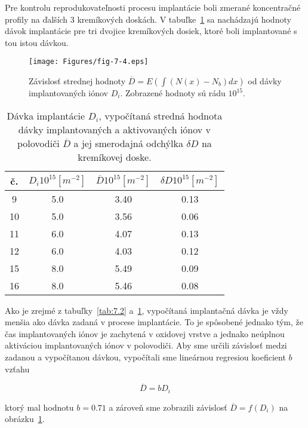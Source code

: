 Pre kontrolu reprodukovateľnosti procesu implantácie boli zmerané
koncentračné profily na ďalších 3 kremíkových doskách.  V
tabuľke~\ref{tab:7.3} sa nachádzajú hodnoty dávok implantácie pre tri
dvojice kremíkových dosiek, ktoré boli implantované s tou istou
dávkou.

\newpage
\begin{figure}[h!]\centering
  \texttt{[image: Figures/fig-7-4.eps]}
  \caption[Závislosť strednej hodnoty
    $\overline{D}=E(\int(N(x)-N_{b})dx)$ od dávky implantovaných iónov
    $D_{i}$]{Závislosť strednej hodnoty
    $\overline{D}=E(\int(N(x)-N_{b})dx)$ od dávky implantovaných iónov
    $D_{i}$. Zobrazené hodnoty sú rádu $10^{15}$.}\label{fig:7.4}
\end{figure}

\begin{table}[h!]\centering
  \begin{tabular}{c c c c}
    \hline
    č. & $D_{i} 10^{15} [m^{-2}]$ & $\overline D 10^{15} [m^{-2}]$ & $\delta D 10^{15} [m^{-2}]$\\
    \hline
     9 & 5.0 & 3.40 & 0.13\\
    10 & 5.0 & 3.56 & 0.06\\
    11 & 6.0 & 4.07 & 0.13\\
    12 & 6.0 & 4.03 & 0.12\\
    15 & 8.0 & 5.49 & 0.09\\
    16 & 8.0 & 5.46 & 0.08\\
    \hline
  \end{tabular}
  \caption[Dávka implantácie $D_{i}$]{Dávka implantácie $D_{i}$,
    vypočítaná stredná hodnota dávky implantovaných a aktivovaných
    iónov v polovodiči $\overline D$ a jej smerodajná odchýlka $\delta
    D$ na kremíkovej doske.}\label{tab:7.3}
\end{table}

Ako je zrejmé z tabuľky~\ref{tab:7.2} a~\ref{tab:7.3}, vypočítaná
implantačná dávka je vždy menšia ako dávka zadaná v procese
implantácie. To je spôsobené jednako tým, že čas implantovaných iónov
je zachytená v oxidovej vrstve a jednako neúplnou aktiváciou
implantovaných iónov v polovodiči. Aby sme určili závislosť medzi
zadanou a vypočítanou dávkou, vypočítali sme lineárnou regresiou
koeficient $b$ vzťahu

\begin{equation}\label{eq:7.1}
  \overline D = bD_{i}
\end{equation}

ktorý mal hodnotu $b = 0.71$ a zároveň sme zobrazili závislosť
$\overline D = f(D_{i})$ na obrázku~\ref{fig:7.4}.

